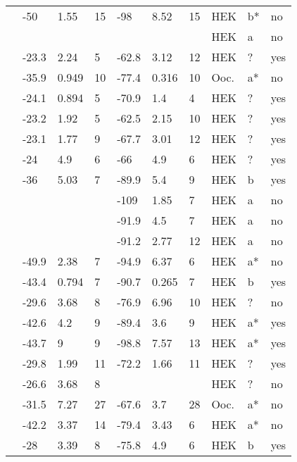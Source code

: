\begin{footnotesize}
\begin{longtable}{p{5cm}|lll|lll|lll}
\citet{Pfahnl2007MutationDB} & -50 & 1.55 & 15 & -98 & 8.52 & 15 & HEK & b* & no \\
\citet{Poelzing2006MutationDB} & && & && & HEK & a & no \\
\citet{Rivolta2001MutationDB} & -23.3 & 2.24 & 5 & -62.8 & 3.12 & 12 & HEK & ? & yes \\
\citet{Rook1999MutationDB} & -35.9 & 0.949 & 10 & -77.4 & 0.316 & 10 & Ooc. & a* & no \\
\citet{Rossenbacker2004MutationDB} & -24.1 & 0.894 & 5 & -70.9 & 1.4 & 4 & HEK & ? & yes \\
\citet{Ruan2007MutationDB} & -23.2 & 1.92 & 5 & -62.5 & 2.15 & 10 & HEK & ? & yes \\
\citet{Ruan2010MutationDB} & -23.1 & 1.77 & 9 & -67.7 & 3.01 & 12 & HEK & ? & yes \\
\citet{Saber2015MutationDB} & -24 & 4.9 & 6 & -66 & 4.9 & 6 & HEK & ? & yes \\
\citet{Samani2009MutationDB} & -36 & 5.03 & 7 & -89.9 & 5.4 & 9 & HEK & b & yes \\
\citet{Sarhan2009MutationDB} & && & -109 & 1.85 & 7 & HEK & a & no \\
\citet{Shinlapawittayatorn2011aMutationDB} & && & -91.9 & 4.5 & 7 & HEK & a & no \\
\citet{Shinlapawittayatorn2011bMutationDB} & && & -91.2 & 2.77 & 12 & HEK & a & no \\
\citet{Shirai2002MutationDB} & -49.9 & 2.38 & 7 & -94.9 & 6.37 & 6 & HEK & a* & no \\
\citet{Shuraih2007MutationDB} & -43.4 & 0.794 & 7 & -90.7 & 0.265 & 7 & HEK & b & yes \\
\citet{Shy2014MutationDB} & -29.6 & 3.68 & 8 & -76.9 & 6.96 & 10 & HEK & ? & no \\
\citet{Smits2005aMutationDB} & -42.6 & 4.2 & 9 & -89.4 & 3.6 & 9 & HEK & a* & yes \\
\citet{Smits2005bMutationDB} & -43.7 & 9 & 9 & -98.8 & 7.57 & 13 & HEK & a* & yes \\
\citet{Sottas2013MutationDB} & -29.8 & 1.99 & 11 & -72.2 & 1.66 & 11 & HEK & ? & yes \\
\citet{Splawski2002MutationDB} & -26.6 & 3.68 & 8 & && & HEK & ? & no \\
\citet{Surber2008MutationDB} & -31.5 & 7.27 & 27 & -67.6 & 3.7 & 28 & Ooc. & a* & no \\
\citet{Surber2008MutationDB} & -42.2 & 3.37 & 14 & -79.4 & 3.43 & 6 & HEK & a* & no \\
\citet{Swan2014MutationDB} & -28 & 3.39 & 8 & -75.8 & 4.9 & 6 & HEK & b & yes \\

\end{longtable}
\end{footnotesize}

